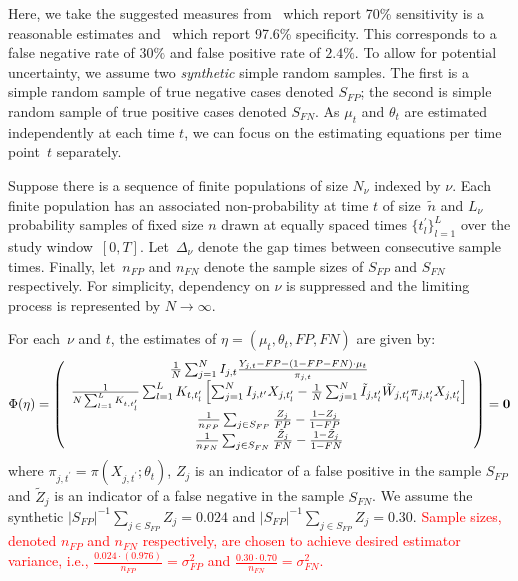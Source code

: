 \documentclass[11pt]{amsart}
\numberwithin{equation}{section}
\theoremstyle{plain}
\begin{document}

Here, we take the suggested measures from~\cite{Woloshin2020} which report 70\% sensitivity is a reasonable estimates and~\cite{Cohen2020} which report 97.6\% specificity.  This corresponds to a false negative rate of $30\%$ and false positive rate of $2.4\%$.  To allow for potential uncertainty, we assume two \emph{synthetic} simple random samples.  The first is a simple random sample of true negative cases denoted $S_{FP}$; the second is simple random sample of true positive cases denoted $S_{FN}$.  As $\mu_t$ and $\theta_{t}$ are estimated independently at each time $t$, we can focus on the estimating equations per time point~$t$ separately.

Suppose there is a sequence of finite populations of size $N_{\nu}$ indexed by $\nu$.  Each finite population has an associated non-probability at time $t$ of  size~$\tilde n$ and $L_\nu$ probability samples of fixed size $n$ drawn at equally spaced times $\{ t^\prime_l \}_{l=1}^L$ over the study window~$[0,T]$. Let~$\Delta_\nu$ denote the gap times between consecutive sample times.  Finally, let~$n_{FP}$ and $n_{FN}$ denote the sample sizes of $S_{FP}$ and $S_{FN}$ respectively.  For simplicity, dependency on $\nu$ is suppressed and the limiting process is represented by $N \to \infty$.

For each~$\nu$ and $t$, the estimates of $\eta = (\mu_t, \theta_t, FP, FN)$ are given by:
$$
\Phi (\eta) = \left (
\begin{array}{c}
\frac{1}{N} \sum_{j=1}^N I_{j,t} \frac{Y_{j,t} - FP - (1-FP-FN) \cdot \mu_t}{\pi_{j,t}} \\
\frac{1}{N \sum_{l=1}^L K_{t,t_l^\prime}} \sum_{l=1}^L K_{t,t_l^\prime} \left[ \sum_{j=1}^N I_{j,t^\prime} X_{j,t^\prime_l} - \frac{1}{N} \sum_{j = 1}^N \tilde I_{j,t_l^\prime} \tilde W_{j,t_l^\prime}  \pi_{j,t_l^\prime} X_{j,t_l^\prime} \right] \\
\frac{1}{n_{FP}} \sum_{j \in S_{FP}} \frac{Z_j}{FP} - \frac{1-Z_j}{1-FP} \\
\frac{1}{n_{FN}} \sum_{j \in S_{FN}} \frac{\tilde Z_j}{FN} - \frac{1-\tilde Z_j}{1-FN} \\
\end{array}
\right ) = {\bf 0}
$$
where $\pi_{j,t^\prime} = \pi (X_{j,t^\prime}; \theta_t)$, $Z_j$ is an indicator of a false positive in the sample $S_{FP}$  and $\tilde Z_j$ is an indicator of a false negative in the sample $S_{FN}$.  We assume the synthetic $|S_{FP}|^{-1} \sum_{j \in S_{FP}} Z_j = 0.024$ and $|S_{FP}|^{-1} \sum_{j \in S_{FP}} Z_j = 0.30$.  \textcolor{red}{Sample sizes, denoted $n_{FP}$ and $n_{FN}$ respectively, are chosen to achieve desired estimator variance, i.e., $\frac{0.024 \cdot (0.976)}{n_{FP}} = \sigma^2_{FP}$ and $\frac{0.30 \cdot 0.70}{n_{FN}} = \sigma^2_{FN}$.}
\end{document}
